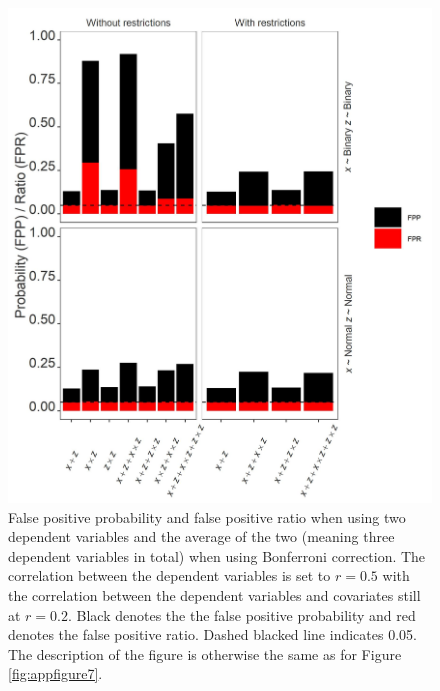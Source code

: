 \begin{figure}[hbt!]
\includegraphics{R/Analysis/Result/Figures/Figure3SIBon.jpeg}
\centering
\caption{False positive probability and false positive ratio when using two dependent variables and the average of the two (meaning three dependent variables in total) when using Bonferroni correction. The correlation between the dependent variables is set to  $\textit{r}=0.5$ with the correlation between the dependent variables and covariates still at  $\textit{r}=0.2$. Black denotes the the false positive probability and red denotes the false positive ratio. Dashed blacked line indicates 0.05. The description of the figure is otherwise the same as for Figure \ref{fig:appfigure7}.}
\label{fig:appfigure9}
\end{figure}


